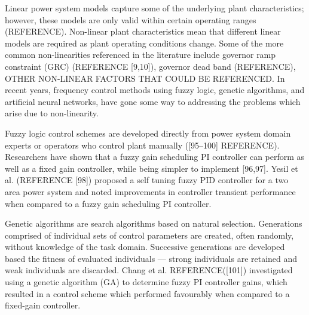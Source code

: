 Linear power system models capture some of the underlying plant characteristics; however, these models are only valid within certain operating ranges (REFERENCE). Non-linear plant characteristics mean that different linear models are required as plant operating conditions change. Some of the more common non-linearities referenced in the literature include governor ramp constraint (GRC) (REFERENCE [9,10]), governor dead band (REFERENCE), OTHER NON-LINEAR FACTORS THAT COULD BE REFERENCED. In recent years, frequency control methods using fuzzy logic, genetic algorithms, and artificial neural networks, have gone some way to addressing the problems which arise due to non-linearity.

Fuzzy logic control schemes are developed directly from power system domain experts or operators who control plant manually ([95–100] REFERENCE). Researchers have shown that a fuzzy gain scheduling PI controller can perform as well as a fixed gain controller, while being simpler to implement [96,97]. Yesil et al. (REFERENCE [98]) proposed a self tuning fuzzy PID controller for a two area power system and noted improvements in controller transient performance when compared to a fuzzy gain scheduling PI controller.

Genetic algorithms are search algorithms based on natural selection. Generations comprised of individual sets of control parameters are created, often randomly, without knowledge of the task domain. Successive generations are developed based the fitness of evaluated individuals --- strong individuals are retained and weak individuals are discarded. Chang et al. REFERENCE([101]) investigated using a genetic algorithm (GA) to determine fuzzy PI controller gains, which resulted in a control scheme which performed favourably when compared to a fixed-gain controller.